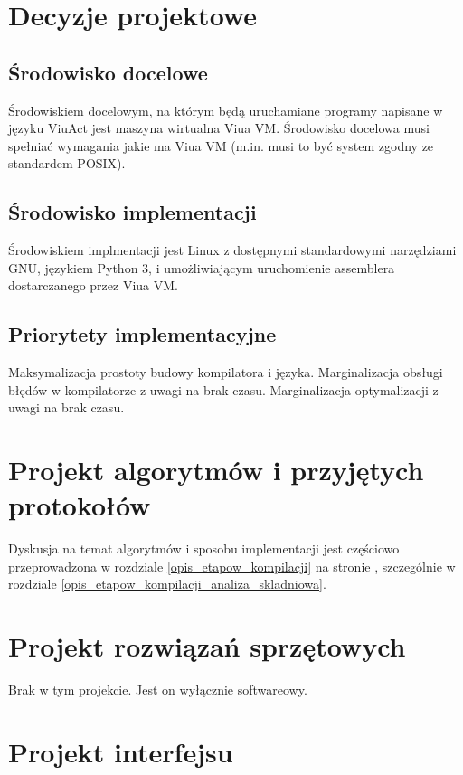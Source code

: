 \section{Decyzje projektowe}

\subsection{Środowisko docelowe}

Środowiskiem docelowym, na którym będą uruchamiane programy napisane w języku ViuAct jest maszyna wirtualna
Viua VM. Środowisko docelowa musi spełniać wymagania jakie ma Viua VM (m.in. musi to być system zgodny ze
standardem POSIX).

\subsection{Środowisko implementacji}

Środowiskiem implmentacji jest Linux z dostępnymi standardowymi narzędziami GNU, językiem Python 3, i
umożliwiającym uruchomienie assemblera dostarczanego przez Viua VM.

\subsection{Priorytety implementacyjne}

Maksymalizacja prostoty budowy kompilatora i języka.
Marginalizacja obsługi błędów w kompilatorze z uwagi na brak czasu.
Marginalizacja optymalizacji z uwagi na brak czasu.

\section{Projekt algorytmów i przyjętych protokołów}

Dyskusja na temat algorytmów i sposobu implementacji jest częściowo przeprowadzona w rozdziale
\ref{opis_etapow_kompilacji} na stronie \pageref{opis_etapow_kompilacji}, szczególnie w rozdziale
\ref{opis_etapow_kompilacji_analiza_skladniowa}.

\section{Projekt rozwiązań sprzętowych}

Brak w tym projekcie. Jest on wyłącznie softwareowy.

\section{Projekt interfejsu}

